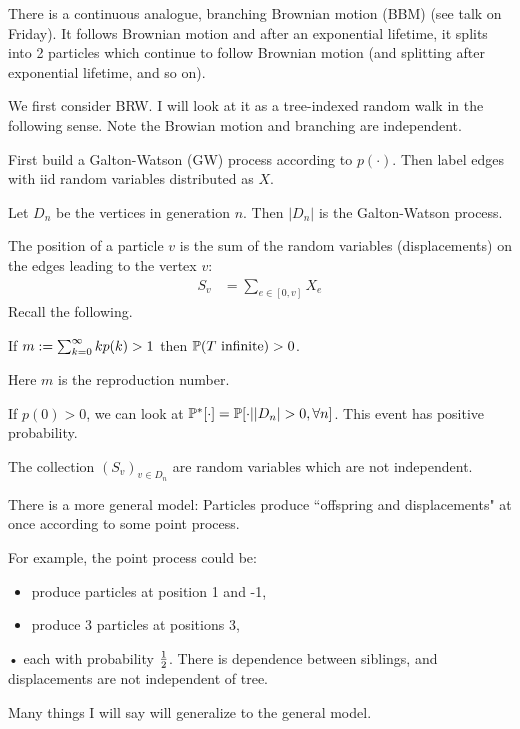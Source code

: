 There is a continuous analogue, branching Brownian motion (BBM) (see talk on Friday).
It follows Brownian motion and after an exponential lifetime, it splits into 2 particles which continue to follow Brownian motion (and splitting after exponential lifetime, and so on).

We first consider BRW. I will look at it as a tree-indexed random walk in the following sense. Note the Browian motion and branching are independent.

First build a Galton-Watson (GW) process according to $p(\cdot)$. Then label edges with iid random variables distributed as $X$.  

Let $D_n$ be the vertices in generation $n$. Then $|D_n|$ is the Galton-Watson process.

The position of a particle $v$ is the sum of the random variables (displacements) on the edges leading to the vertex $v$: 
\begin{align*}
S_v &= \sum_{e\in [0,v]} X_e
\end{align*}
Recall the following.
\begin{thm}
If $m:=\sum_{k=0}^{\infty} kp(k)>1$ then $\mathbb{P}(T\text{ infinite})>0$.

Here $m$ is the reproduction number. %
\end{thm}
If $p(0)>0$, we can look at $\Pj^*[\cdot]  =\Pj[\cdot ||D_n|>0, \forall n]$. This event has positive probability.

The collection $(S_v)_{v\in D_n}$ are random variables which are not independent.


There is a more general model: 
Particles produce ``offspring and displacements" at once according to some point process.

For example, the point process could be:
\begin{itemize}
\item
produce particles at position 1 and -1,
\item
produce 3 particles at positions 3,
\end{itemize}•
each with probability $\frac{1}{2}$. There is dependence between siblings, and displacements are not independent of tree.

Many things I will say will generalize to the general model.

